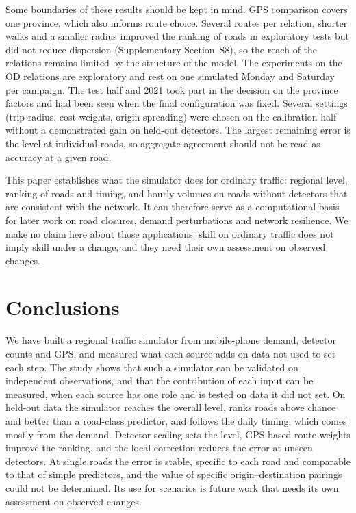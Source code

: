 \documentclass[preprint,11pt,a4paper]{elsarticle}
\begin{document}
Some boundaries of these results should be kept in mind. GPS comparison covers one province, which also informs route choice. Several routes per relation, shorter walks and a smaller radius improved the ranking of roads in exploratory tests but did not reduce dispersion (Supplementary Section~S8), so the reach of the relations remains limited by the structure of the model. The experiments on the OD relations are exploratory and rest on one simulated Monday and Saturday per campaign. The test half and 2021 took part in the decision on the province factors and had been seen when the final configuration was fixed. Several settings (trip radius, cost weights, origin spreading) were chosen on the calibration half without a demonstrated gain on held-out detectors. The largest remaining error is the level at individual roads, so aggregate agreement should not be read as accuracy at a given road.

This paper establishes what the simulator does for ordinary traffic: regional level, ranking of roads and timing, and hourly volumes on roads without detectors that are consistent with the network. It can therefore serve as a computational basis for later work on road closures, demand perturbations and network resilience. We make no claim here about those applications: skill on ordinary traffic does not imply skill under a change, and they need their own assessment on observed changes.

\section{Conclusions}
\label{sec:conclusions}
We have built a regional traffic simulator from mobile-phone demand, detector counts and GPS, and measured what each source adds on data not used to set each step. The study shows that such a simulator can be validated on independent observations, and that the contribution of each input can be measured, when each source has one role and is tested on data it did not set. On held-out data the simulator reaches the overall level, ranks roads above chance and better than a road-class predictor, and follows the daily timing, which comes mostly from the demand. Detector scaling sets the level, GPS-based route weights improve the ranking, and the local correction reduces the error at unseen detectors. At single roads the error is stable, specific to each road and comparable to that of simple predictors, and the value of specific origin--destination pairings could not be determined. Its use for scenarios is future work that needs its own assessment on observed changes.
\end{document}
